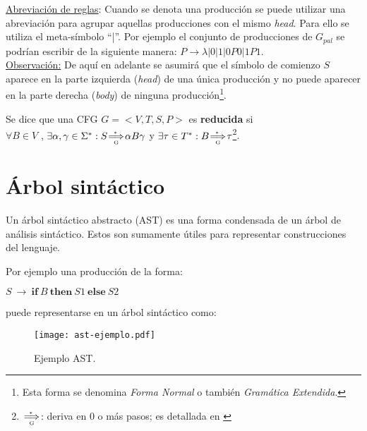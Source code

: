 \underline{Abreviación de reglas}: Cuando se denota una producción se puede utilizar una abreviación para agrupar aquellas producciones con el mismo \textit{head}. Para ello se utiliza el meta-símbolo ``|''. Por ejemplo el conjunto de producciones de $G_{pal}$ se podrían escribir de la siguiente manera: $P \rightarrow \lambda | 0 | 1 | 0P0 | 1P1$.\\


\underline{Observación:}
De aquí en adelante se asumirá que el símbolo de comienzo $S$ aparece en la parte izquierda (\textit{head}) de una única producción y no puede aparecer en la parte derecha (\textit{body}) de ninguna producción\footnote{Esta forma se denomina \emph{Forma Normal} o también \textit{Gramática Extendida}.}. \\


\begin{definition} Se dice que una CFG $G = < V,T,S,P>$
es \textbf{reducida} si\\
$\forall B \in V$ , $\exists \alpha , \gamma \in \Sigma^{*} : S \clausderiva{G} \alpha B \gamma$ y $\exists \tau \in T^{*} : B \clausderiva{G} \tau$\footnote{ $\clausderiva{G}$: deriva en $0$ o más pasos; es detallada en \cite{tesismarcelo}}.
\label{def:reducida}
\end{definition}

\section{Árbol sintáctico}

Un árbol sintáctico abstracto (AST) es una forma condensada de un árbol de análisis sintáctico. Estos son sumamente útiles para representar construcciones del lenguaje.

Por ejemplo una producción de la forma:
\begin{center}\large
$S\ \rightarrow\ \textbf{if}\ B\ \textbf{then}\ S1\ \textbf{else}\ S2$                                                                      \end{center}
puede representarse en un árbol sintáctico como:

\begin{figure}[!ht]\centering
\texttt{[image: ast-ejemplo.pdf]}
\caption{\label{ejem-ast} Ejemplo AST.}
\end{figure}

